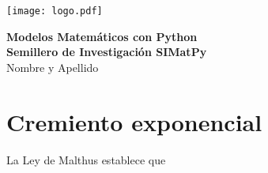 \documentclass[12pt,letterpaper]{article}
\begin{document}
	\parbox{7cm}{\texttt{[image: logo.pdf]}}\hfill
	\parbox{11cm}{
		\begin{center}
			\textbf{Modelos Matemáticos con Python}	\\
			\textbf{Semillero de Investigación SIMatPy} \\
		    Nombre y Apellido
		\end{center}
	}
	
	\section{Cremiento exponencial}

	La \textcolor{azul}{Ley de Malthus} establece que 
	
\end{document}
